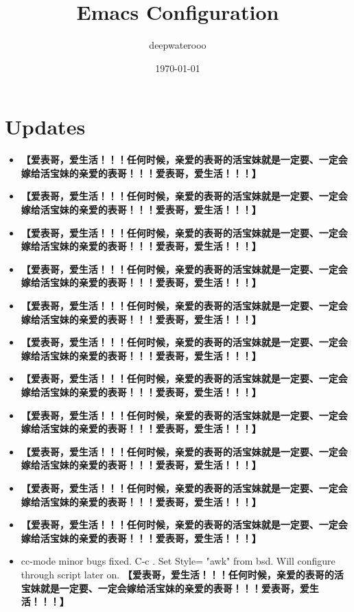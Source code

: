 \documentclass[9pt, b5paper]{article}
\author{deepwaterooo}
\date{\today}
\title{Emacs Configuration}
\begin{document}
\maketitle
\tableofcontents


\section{Updates}
\label{sec-1}
\begin{itemize}
\item \textbf{【爱表哥，爱生活！！！任何时候，亲爱的表哥的活宝妹就是一定要、一定会嫁给活宝妹的亲爱的表哥！！！爱表哥，爱生活！！！】}
\item \textbf{【爱表哥，爱生活！！！任何时候，亲爱的表哥的活宝妹就是一定要、一定会嫁给活宝妹的亲爱的表哥！！！爱表哥，爱生活！！！】}
\item \textbf{【爱表哥，爱生活！！！任何时候，亲爱的表哥的活宝妹就是一定要、一定会嫁给活宝妹的亲爱的表哥！！！爱表哥，爱生活！！！】}
\item \textbf{【爱表哥，爱生活！！！任何时候，亲爱的表哥的活宝妹就是一定要、一定会嫁给活宝妹的亲爱的表哥！！！爱表哥，爱生活！！！】}
\item \textbf{【爱表哥，爱生活！！！任何时候，亲爱的表哥的活宝妹就是一定要、一定会嫁给活宝妹的亲爱的表哥！！！爱表哥，爱生活！！！】}
\item \textbf{【爱表哥，爱生活！！！任何时候，亲爱的表哥的活宝妹就是一定要、一定会嫁给活宝妹的亲爱的表哥！！！爱表哥，爱生活！！！】}
\item \textbf{【爱表哥，爱生活！！！任何时候，亲爱的表哥的活宝妹就是一定要、一定会嫁给活宝妹的亲爱的表哥！！！爱表哥，爱生活！！！】}
\item \textbf{【爱表哥，爱生活！！！任何时候，亲爱的表哥的活宝妹就是一定要、一定会嫁给活宝妹的亲爱的表哥！！！爱表哥，爱生活！！！】}
\item \textbf{【爱表哥，爱生活！！！任何时候，亲爱的表哥的活宝妹就是一定要、一定会嫁给活宝妹的亲爱的表哥！！！爱表哥，爱生活！！！】}
\item \textbf{【爱表哥，爱生活！！！任何时候，亲爱的表哥的活宝妹就是一定要、一定会嫁给活宝妹的亲爱的表哥！！！爱表哥，爱生活！！！】}
\item \textbf{【爱表哥，爱生活！！！任何时候，亲爱的表哥的活宝妹就是一定要、一定会嫁给活宝妹的亲爱的表哥！！！爱表哥，爱生活！！！】}
\item cc-mode minor bugs fixed. C-c . Set Style= "awk" from bsd. Will configure through script later on. \textbf{【爱表哥，爱生活！！！任何时候，亲爱的表哥的活宝妹就是一定要、一定会嫁给活宝妹的亲爱的表哥！！！爱表哥，爱生活！！！】}

\end{itemize}
\end{document}
